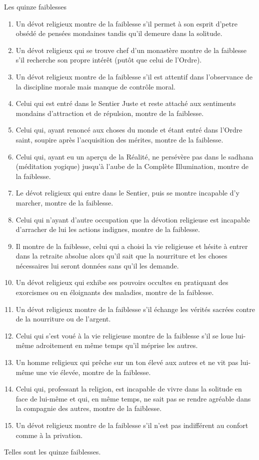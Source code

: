 \documentclass[10pt]{book}
\makeatletter
\renewcommand{\section}{\@startsection{section}{0}{0mm}
   {\baselineskip}
   {\baselineskip}{\normalfont\normalsize\scshape\centering}
}
\makeatother
\begin{document}
\section{Les quinze faiblesses}
\begin{enumerate}[1.-]
\item Un dévot religieux montre de la faiblesse s'il permet à son esprit d'petre obsédé de pensées mondaines tandis qu'il demeure dans la solitude.
\item Un dévot religieux qui se trouve chef d'un monastère montre de la faiblesse s'il recherche son propre intérêt (putôt que celui de l'Ordre).
\item Un dévot religieux montre de la faiblesse s'il est attentif dans l'observance de la discipline morale mais manque de contrôle moral.
\item Celui qui est entré dans le Sentier Juste et reste attaché aux sentiments mondains d'attraction et de répulsion, montre de la faiblesse.
\item Celui qui, ayant renoncé aux choses du monde et étant entré dans l'Ordre saint, soupire après l'acquisition des mérites, montre de la faiblesse.
\item Celui qui, ayant eu un aperçu de la Réalité, ne persévère pas dans le sadhana (méditation yogique) jusqu'à l'aube de la Complète Illumination, montre de la faiblesse.
\item Le dévot religieux qui entre dans le Sentier, puis se montre incapable d'y marcher, montre de la faiblesse.
\item Celui qui n'ayant d'autre occupation que la dévotion religieuse est incapable d'arracher de lui les actions indignes, montre de la faiblesse.
\item Il montre de la faiblesse, celui qui a choisi la vie religieuse et hésite à entrer dans la retraite absolue alors qu'il sait que la nourriture et les choses nécessaires lui seront données sans qu'il les demande.
\item Un dévot religieux qui exhibe ses pouvoirs occultes en pratiquant des exorcismes ou en éloignants des maladies, montre de la faiblesse.
\item Un dévot religieux montre de la faiblesse s'il échange les vérités sacrées contre de la nourriture ou de l'argent.
\item Celui qui s'est voué à la vie religieuse montre de la faiblesse s'il se loue lui-même adroitement en même temps qu'il méprise les autres.
\item Un homme religieux qui prêche sur un ton élevé aux autres et ne vit pas lui-même une vie élevée, montre de la faiblesse.
\item Celui qui, professant la religion, est incapable de vivre dans la solitude en face de lui-même et qui, en même temps, ne sait pas se rendre agréable dans la compagnie des autres, montre de la faiblesse.
\item Un dévot religieux montre de la faiblesse s'il n'est pas indifférent au confort comme à la privation.
\end{enumerate}
Telles sont les quinze faiblesses.
\end{document}
